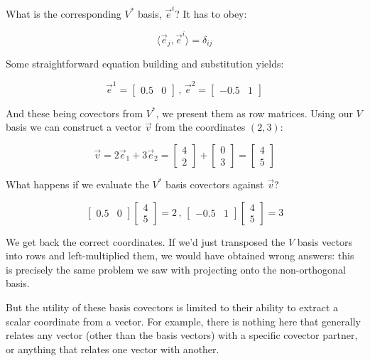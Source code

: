 What is the corresponding $V^*$ basis, $\vec{e}^i$? It has to obey:

$$
\langle \vec{e}_j,\vec{e}^i \rangle = \delta_{ij}
$$

Some straightforward equation building and substitution yields:

$$
\vec{e}^1 = \begin{bmatrix}0.5 & 0\end{bmatrix}\,,\,
\vec{e}^2 = \begin{bmatrix}-0.5 & 1\end{bmatrix}
$$

And these being covectors from $V^*$, we present them as row matrices. Using our $V$ basis we can construct a vector $\vec{v}$ from the coordinates $(2, 3)$:

$$
\vec{v} = 2\vec{e}_1 + 3\vec{e}_2
        = \begin{bmatrix}4 \\ 2\end{bmatrix} + \begin{bmatrix}0 \\ 3\end{bmatrix} 
        = \begin{bmatrix}4 \\ 5\end{bmatrix}
$$

What happens if we evaluate the $V^*$ basis covectors against $\vec{v}$?

$$
\begin{bmatrix}0.5 & 0\end{bmatrix} \begin{bmatrix}4 \\ 5\end{bmatrix} = 2 
\,,\,
\begin{bmatrix}-0.5 & 1\end{bmatrix} \begin{bmatrix}4 \\ 5\end{bmatrix} = 3
$$

We get back the correct coordinates. If we'd just transposed the $V$ basis vectors into rows and left-multiplied them, we would have obtained wrong answers: this is precisely the same problem we saw with projecting onto the non-orthogonal basis.

But the utility of these basis covectors is limited to their ability to extract a scalar coordinate from a vector. For example, there is nothing here that generally relates any vector (other than the basis vectors) with a specific covector partner, or anything that relates one vector with another.

